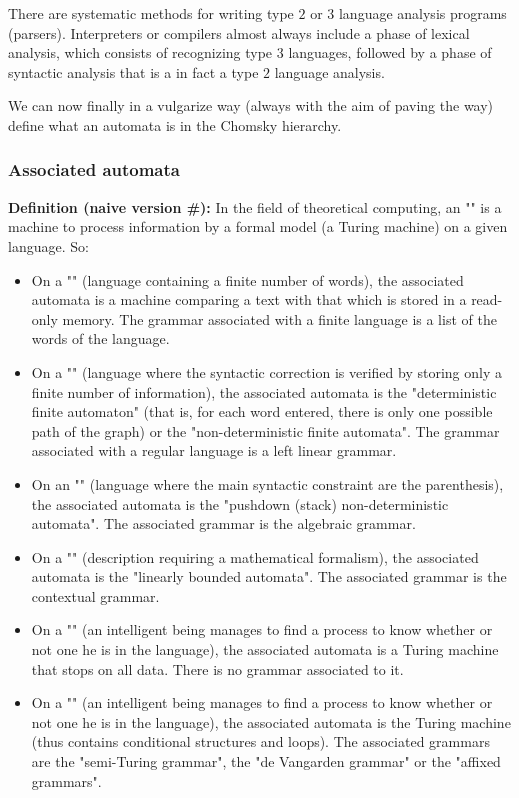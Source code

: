 	There are systematic methods for writing type $2$ or $3$ language analysis programs (parsers). Interpreters or compilers almost always include a phase of lexical analysis, which consists of recognizing type $3$ languages, followed by a phase of syntactic analysis that is a in fact a type $2$ language analysis.

	We can now finally in a vulgarize way (always with the aim of paving the way) define what an automata is in the Chomsky hierarchy.
	
	\subsubsection{Associated automata}
	\textbf{Definition (naive version \#\mydef):}  In the field of theoretical computing, an "" is a machine to process information by a formal model (a Turing machine) on a given language. So:
	\begin{itemize}
		\item On a "" (language containing a finite number of words), the associated automata is a machine comparing a text with that which is stored in a read-only memory. The grammar associated with a finite language is a list of the words of the language.
		
		\item On a "" (language where the syntactic correction is verified by storing only a finite number of information), the associated automata is the "deterministic finite automaton" (that is, for each word entered, there is only one possible path of the graph) or the "non-deterministic finite automata". The grammar associated with a regular language is a left linear grammar.
		
		\item On an "" (language where the main syntactic constraint are the parenthesis), the associated automata is the "pushdown (stack) non-deterministic automata". The associated grammar is the algebraic grammar.
		
		\item On a "" (description requiring a mathematical formalism), the associated automata is the  "linearly bounded automata". The associated grammar is the contextual grammar.
		
		\item On a "" (an intelligent being manages to find a process to know whether or not one he is in the language), the associated automata is a Turing machine that stops on all data. There is no grammar associated to it.
		
		\item On a "" (an intelligent being manages to find a process to know whether or not one he is in the language), the associated  automata is the Turing machine (thus contains conditional structures and loops). The associated grammars are the "semi-Turing grammar", the "de Vangarden grammar" or the "affixed grammars".
	\end{itemize}
	
